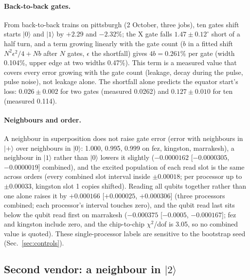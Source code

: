 \documentclass[reprint,amsmath,amssymb,aps,superscriptaddress,nofootinbib]{revtex4-2}
\begin{document}
\paragraph*{Back-to-back gates.} From back-to-back trains on pittsburgh (2 October, three jobs), ten gates shift starts $|0\rangle$ and $|1\rangle$ by $+2.29$ and $-2.32\%$; the X gate falls $1.47\pm0.12^\circ$ short of a half turn, and a term growing linearly with the gate count ($b$ in a fitted shift $N^2\epsilon^2/4+Nb$ after $N$ gates, $\epsilon$ the shortfall) gives $4b=0.261\%$ per gate (width 0.104\%, upper edge at two widths 0.47\%). This term is a measured value that covers every error growing with the gate count (leakage, decay during the pulse, pulse noise), not leakage alone. The shortfall alone predicts the equator start's loss: $0.026\pm0.002$ for two gates (measured 0.0262) and $0.127\pm0.010$ for ten (measured 0.114).

\paragraph*{Neighbours and order.} A neighbour in superposition does not raise gate error (error with neighbours in $|+\rangle$ over neighbours in $|0\rangle$: 1.000, 0.995, 0.999 on fez, kingston, marrakesh), a neighbour in $|1\rangle$ rather than $|0\rangle$ lowers it slightly ($-0.0000162$ [$-0.0000305$, $-0.0000019$] combined), and the excited population of each read slot is the same across orders (every combined slot interval inside $\pm0.00018$; per processor up to $\pm0.00033$, kingston slot 1 copies shifted). Reading all qubits together rather than one alone raises it by $+0.000166$ [$+0.000025$, $+0.000306$] (three processors combined; each processor's interval touches zero), and the qubit read last sits below the qubit read first on marrakesh ($-0.000375$ [$-0.0005$, $-0.000167$]; fez and kingston include zero, and the chip-to-chip $\chi^2$/dof is 3.05, so no combined value is quoted). These single-processor labels are sensitive to the bootstrap seed (Sec.~\ref{sec:controls}).

\subsection{Second vendor: a neighbour in $|2\rangle$}\label{sec:rigetti}
\end{document}
